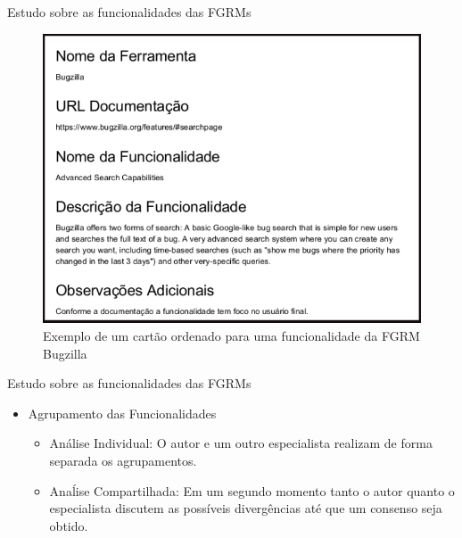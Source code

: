 \documentclass[t,14pt,mathserif]{beamer}
\begin{document}
\begin{frame}{Estudo sobre as funcionalidades das FGRMs}

    \begin{figure}[htpb]
        \centering
        \includegraphics[width=0.55\linewidth]{../img/exemplo_cartao_ordenado.png}
        \caption{Exemplo de um cartão ordenado para uma funcionalidade da FGRM
            Bugzilla}\label{fig:exemplo_cartao_ordenado}
    \end{figure}
\end{frame}

\begin{frame}{Estudo sobre as funcionalidades das FGRMs}
    \begin{itemize}
        \item Agrupamento das Funcionalidades
            \begin{itemize}
                \item Análise Individual: O autor e um outro especialista
                    realizam de forma separada os agrupamentos.
                \item Anaĺise Compartilhada: Em um segundo momento tanto o autor
                    quanto o es\-pe\-ci\-a\-lis\-ta discutem as possíveis
                    divergências até que um consenso seja obtido.
            \end{itemize}
    \end{itemize}
\end{frame}
\end{document}
